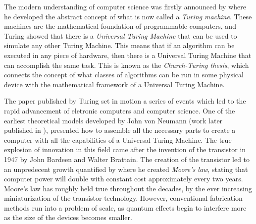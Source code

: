 \documentclass[../../dissertation.tex]{subfiles}
\begin{document}
The modern understanding of computer science was firstly announced by
\cite{turing1936} where he developed the abstract concept of what is now called
a \textit{Turing machine}. These machines are the mathematical foundation of
programmable computers, and Turing showed that there is a \textit{Universal
Turing Machine} that can be used to simulate any other Turing Machine. This
means that if an algorithm can be executed in any piece of hardware, then there
is a Universal Turing Machine that can accomplish the same task. This is known as
the \textit{Church-Turing thesis}, which connects the concept of what classes
of algorithms can be run in some physical device with the mathematical
framework of a Universal Turing Machine.\par The paper published by Turing set
in motion a series of events which led to the rapid advancement of eletronic
computers and computer science. One of the earliest theoretical models
developed by John von Neumann (work later published in \cite{Neumann93} ),
presented how to assemble all the necessary parts to create a computer with all
the capabilities of a Universal Turing Machine. The true explosion of
innovation in this field came after the invention of the transistor in 1947 by
John Bardeen and Walter Brattain. The creation of the transistor led to an
unpredecent growth quantified by  \cite{moore1965} where he created
\textit{Moore's law}, stating that computer power will double with constant
cost approximately every two years. Moore's law has roughly held true
throughout the decades, by the ever increasing miniaturization of the
transistor technology. However, conventional fabrication methods run into a
problem of scale, as quantum effects begin to interfere more as the size of the
devices becomes smaller.\par
\end{document}
